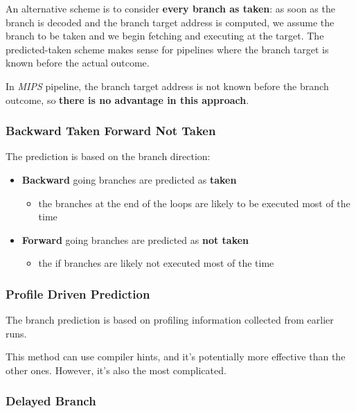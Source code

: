 \documentclass[english]{article}
\begin{document}
An alternative scheme is to consider \textbf{every branch as taken}: as soon as the branch is decoded and the branch target address is computed, we assume the branch to be taken and we begin fetching and executing at the target.
The predicted-taken scheme makes sense for pipelines where the branch target is known before the actual outcome.

In \textit{MIPS} pipeline, the branch target address is not known before the branch outcome, so \textbf{there is no advantage in this approach}.

\subsubsection{Backward Taken Forward Not Taken}
\label{sec:backward-taken-forward-not-taken}

The prediction is based on the branch direction:

\begin{itemize}
  \item \textbf{Backward} going branches are predicted as \textbf{taken}
        \begin{itemize}
          \item the branches at the end of the loops are likely to be executed most of the time
        \end{itemize}
  \item \textbf{Forward} going branches are predicted as \textbf{not taken}
        \begin{itemize}
          \item the if branches are likely not executed most of the time
        \end{itemize}
\end{itemize}

\subsubsection{Profile Driven Prediction}
\label{sec:profile-driven-prediction}

The branch prediction is based on profiling information collected from earlier runs.

This method can use compiler hints, and it's potentially more effective than the other ones.
However, it's also the most complicated.

\subsubsection{Delayed Branch}
\label{sec:delayed-branch}
\end{document}
